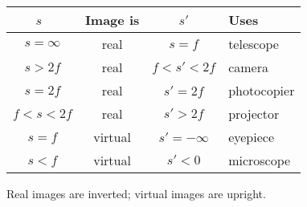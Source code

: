 \documentclass[../main.tex]{subfiles}
\begin{document}
	\begin{center}
		\begin{tabularx}{0.95\linewidth}{cccX}
			\hline \hline
			\(s\)\ & Image is & \(s'\) & Uses \\ 
			\hline 
			\(s=\infty\) & real & \(s=f\) & telescope \\  
			\(s>2f\) & real & \(f<s'<2f\) & camera \\  
			\(s=2f\) & real & \(s'=2f\) & photocopier \\  
			\(f<s<2f\) & real & \(s'>2f\) & projector \\  
			\(s=f\) & virtual & \(s'=-\infty\) & eyepiece \\  
			\(s<f\) & virtual & \(s'<0\) & microscope \\ 
			\hline \hline
		\end{tabularx} 
	\end{center}

	Real images are inverted; virtual images are upright.
	
	
\end{document}
